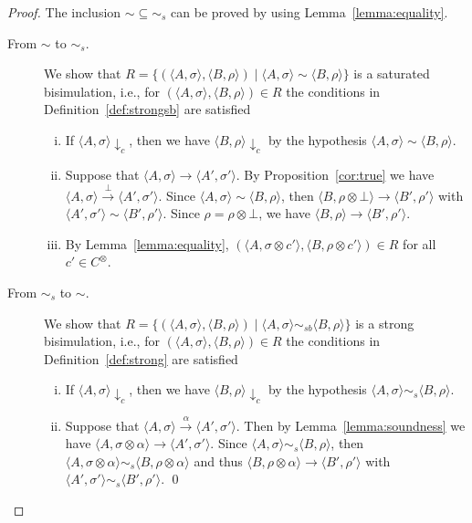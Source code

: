 \documentclass[main.tex]{subfiles}
\begin{document}
\begin{proof}%
	The inclusion $\sim \subseteq \sim_{s}$ can be proved by using Lemma~\ref{lemma:equality}.
	\begin{description}
		\item[From $\sim$ to $\sim_{s}$.]
		We show that $R = \{ (\langle A, \sigma \rangle, \langle B, \rho \rangle) \mid  \langle A, \sigma\rangle \sim \langle B, \rho\rangle\}$
		is a saturated bisimulation, i.e.,
		for $(\langle A, \sigma \rangle, \langle B, \rho \rangle) \in R$ the conditions in Definition~\ref{def:strongsb} are satisfied
		\begin{enumerate}[i)]
			\item If $\langle A, \sigma \rangle \downarrow_c$, then we have $\langle B, \rho \rangle \downarrow_c$ by the hypothesis
			$\langle A, \sigma\rangle \sim \langle B, \rho\rangle$.
			\item Suppose that $\langle A, \sigma\rangle \rightarrow \langle A', \sigma' \rangle$. By Proposition~\ref{cor:true}
			we have $\langle A, \sigma\rangle \xrightarrow{\;  \bot \: } \langle A', \sigma' \rangle$.
			Since $\langle A, \sigma\rangle \sim \langle B, \rho\rangle$, then $\langle B, \rho \otimes \bot \rangle \rightarrow \langle B', \rho'\rangle$ with $\langle A', \sigma'\rangle \sim \langle B', \rho' \rangle$.
			Since $\rho = \rho \otimes \bot$, we have $\langle B, \rho  \rangle \rightarrow \langle B', \rho'\rangle$.
			\item By  Lemma~\ref{lemma:equality},
			$(\langle A, \sigma \otimes c'\rangle, \langle B, \rho \otimes c'\rangle) \in R$ for all $c' \in C^{\otimes}$.
		\end{enumerate}
		\item[From $\sim_{s}$ to $\sim$.]
		We show that $R = \{ (\langle A, \sigma \rangle, \langle B, \rho \rangle) \mid  \langle A, \sigma\rangle \sim_{sb} \langle B, \rho\rangle\}$
		is a strong bisimulation, i.e., for $(\langle A, \sigma \rangle, \langle B, \rho \rangle) \in R$
		the conditions in Definition~\ref{def:strong} are satisfied
		\begin{enumerate}[i)]
			\item If $\langle A, \sigma \rangle \downarrow_c$, then we have $\langle B, \rho \rangle \downarrow_c$ by the hypothesis $\langle A, \sigma\rangle \sim_{s} \langle B, \rho\rangle$.
			\item Suppose that $\langle A, \sigma\rangle \xrightarrow{\;  \alpha \: } \langle A', \sigma' \rangle$.
			Then by Lemma~\ref{lemma:soundness} we have $\langle A, \sigma \otimes \alpha \rangle \rightarrow \langle A', \sigma'\rangle$.
			Since $\langle A, \sigma\rangle \sim_{s} \langle B, \rho\rangle$,
			then  $\langle A, \sigma \otimes \alpha \rangle \sim_{s} \langle B, \rho \otimes \alpha\rangle$ and
			thus $\langle B, \rho \otimes \alpha \rangle \rightarrow \langle B', \rho'\rangle$
			with $\langle A', \sigma'\rangle \sim_{s} \langle B', \rho'\rangle$. \qed
		\end{enumerate}
	\end{description} 
\end{proof}
\end{document}
